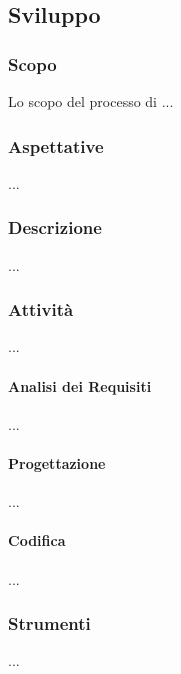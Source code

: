 \subsection{Sviluppo}
    \subsubsection{Scopo}
        Lo scopo del processo di ...
    \subsubsection{Aspettative}
        ...
    \subsubsection{Descrizione}
        ...
    \subsubsection{Attività}
        ...
        \paragraph{Analisi dei Requisiti}
            ...
        \paragraph{Progettazione}
            ...
        \paragraph{Codifica}
            ...
    \subsubsection{Strumenti}
        ...